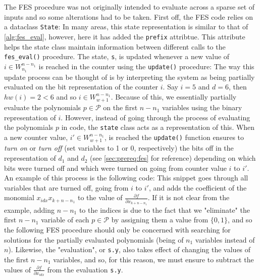 The FES procedure was not originally intended to evaluate across a sparse set of inputs and so some alterations had to be taken. First off, the FES code relies on a dataclass \texttt{State}:
In many areas, this state representation is similar to that of \cref{alg:fes_eval}, however, here it has added the \texttt{prefix} attribtue. This attribute helps the state class maintain information between different calls to the \texttt{fes\_eval()} procedure. The state, \texttt{s}, is updated whenever a new value of $i \in W^{n - n_1}_{n_1}$ is reached in the counter using the \texttt{update()} procedure:
The way this update process can be thought of is by interpreting the system as being partially evaluated on the bit representation of the counter $i$. Say $i = 5$ and $d = 6$, then $hw(i) = 2 < 6$ and so $i \in W^{n - n_1}_{w + 1}$. Because of this, we essentially partially evaluate the polynomials $p \in \mathcal{P}$ on the first $n - n_1$ variables using the binary representation of $i$. However, instead of going through the process of evaluating the polynomials $p$ in code, the \texttt{state} class acts as a representation of this. When a new counter value, $i' \in W^{n - n_1}_{w + 1}$, is reached the \texttt{update()} function ensures to \textit{turn on} or \textit{turn off} (set variables to 1 or 0, respectively) the bits off in the representation of $d_1$ and $d_2$ (see \cref{sec:prereq:fes} for reference) depending on which bits were turned off and which were turned on going from counter value $i$ to $i'$. An example of this process is the following code:
This snippet goes through all variables that are turned off, going from $i$ to $i'$, and adds the coefficient of the monomial $x_{idx}x_{k + n - n_1}$ to the value of $\frac{\partial f}{\partial x_{k + n - n_1}}$. If it is not clear from the example, adding $n - n_1$ to the indices is due to the fact that we "eliminate" the first $n - n_1$ variable of each $p \in \mathcal{P}$ by assigning them a value from $\{0,1\}$, and so the following FES procedure should only be concerned with searching for solutions for the partially evaluated polynomials (being of $n_1$ variables instead of $n$). Likewise, the "evaluation", or \texttt{s.y}, also takes effect of changing the values of the first $n - n_1$ variables, and so, for this reason, we must ensure to subtract the values of $\frac{\partial f}{\partial x_{idx}}$ from the evaluation \texttt{s.y}.

